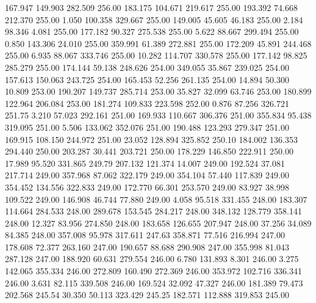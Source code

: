  167.947  149.903  282.509       256.00
 183.175  104.671  219.617       255.00
 193.392   74.668  212.370       255.00
   1.050  100.358  329.667       255.00
 149.005   45.605   46.183       255.00
   2.184   98.346    4.081       255.00
 177.182   90.327  275.538       255.00
   5.622   88.667  299.494       255.00
   0.850  143.306   24.010       255.00
 359.991   61.389  272.881       255.00
 172.209   45.891  244.468       255.00
   6.935   88.067  333.746       255.00
  10.282  114.707  330.578       255.00
 177.142   98.825  285.279       255.00
 174.144   59.138  248.626       254.00
 349.055   35.867  239.025       254.00
 157.613  150.063  243.725       254.00
 165.453   52.256  261.135       254.00
  14.894   50.300   10.809       253.00
 190.207  149.737  285.714       253.00
  35.827   32.099   63.746       253.00
 180.899  122.964  206.084       253.00
 181.274  109.833  223.598       252.00
   0.876   87.256  326.721       251.75
   3.210   57.023  292.161       251.00
 169.933  110.667  306.376       251.00
 355.834   95.438  319.095       251.00
   5.506  133.062  352.076       251.00
 190.488  123.293  279.347       251.00
 169.915  108.150  244.972       251.00
  23.052  128.894  325.852       250.10
 184.002  136.353  294.440       250.00
 203.287   30.441  203.721       250.00
 178.229  146.850  222.911       250.00
  17.989   95.520  331.865       249.79
 207.132  121.374   14.007       249.00
 192.524   37.081  217.714       249.00
 357.968   87.062  322.179       249.00
 354.104   57.440  117.839       249.00
 354.452  134.556  322.833       249.00
 172.770   66.301  253.570       249.00
  83.927   38.998  109.522       249.00
 146.908   46.744   77.880       249.00
   4.058   95.518  331.455       248.00
 183.307  114.664  284.533       248.00
 289.678  153.545  284.217       248.00
 348.132  128.779  358.141       248.00
  12.327   83.956  274.850       248.00
 183.658  126.655  207.947       248.00
  37.256   34.089   84.385       248.00
 357.008   95.978  317.611       247.63
 358.871   77.516  216.994       247.00
 178.608   72.377  263.160       247.00
 190.657   88.688  290.908       247.00
 355.998   81.043  287.128       247.00
 188.920   60.631  279.554       246.00
   6.780  131.893    8.301       246.00
   3.275  142.065  355.334       246.00
 272.809  160.490  272.369       246.00
 353.972  102.716  336.341       246.00
   3.631   82.115  339.508       246.00
 169.524   32.092   47.327       246.00
 181.389   79.473  202.568       245.54
  30.350   50.113  323.429       245.25
 182.571  112.888  319.853       245.00
